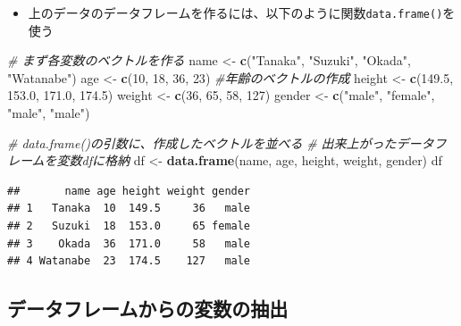 \documentclass[
]{book}
\newenvironment{Shaded}{\begin{snugshade}}{\end{snugshade}}
\newcommand{\CommentTok}[1]{\textcolor[rgb]{0.56,0.35,0.01}{\textit{#1}}}
\newcommand{\DecValTok}[1]{\textcolor[rgb]{0.00,0.00,0.81}{#1}}
\newcommand{\FloatTok}[1]{\textcolor[rgb]{0.00,0.00,0.81}{#1}}
\newcommand{\FunctionTok}[1]{\textcolor[rgb]{0.13,0.29,0.53}{\textbf{#1}}}
\newcommand{\NormalTok}[1]{#1}
\newcommand{\OtherTok}[1]{\textcolor[rgb]{0.56,0.35,0.01}{#1}}
\newcommand{\StringTok}[1]{\textcolor[rgb]{0.31,0.60,0.02}{#1}}
\providecommand{\tightlist}{%
  \setlength{\itemsep}{0pt}\setlength{\parskip}{0pt}}
\begin{document}
\begin{itemize}
\tightlist
\item
  上のデータのデータフレームを作るには、以下のように関数\texttt{data.frame()}を使う
\end{itemize}

\begin{Shaded}
\begin{Highlighting}[]
\CommentTok{\# まず各変数のベクトルを作る}
\NormalTok{name }\OtherTok{\textless{}{-}} \FunctionTok{c}\NormalTok{(}\StringTok{"Tanaka"}\NormalTok{, }\StringTok{"Suzuki"}\NormalTok{, }\StringTok{"Okada"}\NormalTok{, }\StringTok{"Watanabe"}\NormalTok{)}
\NormalTok{age }\OtherTok{\textless{}{-}} \FunctionTok{c}\NormalTok{(}\DecValTok{10}\NormalTok{, }\DecValTok{18}\NormalTok{, }\DecValTok{36}\NormalTok{, }\DecValTok{23}\NormalTok{) }\CommentTok{\#年齢のベクトルの作成}
\NormalTok{height }\OtherTok{\textless{}{-}} \FunctionTok{c}\NormalTok{(}\FloatTok{149.5}\NormalTok{, }\FloatTok{153.0}\NormalTok{, }\FloatTok{171.0}\NormalTok{, }\FloatTok{174.5}\NormalTok{)}
\NormalTok{weight }\OtherTok{\textless{}{-}} \FunctionTok{c}\NormalTok{(}\DecValTok{36}\NormalTok{, }\DecValTok{65}\NormalTok{, }\DecValTok{58}\NormalTok{, }\DecValTok{127}\NormalTok{)}
\NormalTok{gender }\OtherTok{\textless{}{-}} \FunctionTok{c}\NormalTok{(}\StringTok{"male"}\NormalTok{, }\StringTok{"female"}\NormalTok{, }\StringTok{"male"}\NormalTok{, }\StringTok{"male"}\NormalTok{) }

\CommentTok{\# data.frame()の引数に、作成したベクトルを並べる}
\CommentTok{\# 出来上がったデータフレームを変数dfに格納}
\NormalTok{df }\OtherTok{\textless{}{-}} \FunctionTok{data.frame}\NormalTok{(name, age, height, weight, gender)}
\NormalTok{df}
\end{Highlighting}
\end{Shaded}

\begin{verbatim}
##       name age height weight gender
## 1   Tanaka  10  149.5     36   male
## 2   Suzuki  18  153.0     65 female
## 3    Okada  36  171.0     58   male
## 4 Watanabe  23  174.5    127   male
\end{verbatim}

\hypertarget{ux30c7ux30fcux30bfux30d5ux30ecux30fcux30e0ux304bux3089ux306eux5909ux6570ux306eux62bdux51fa}{%
\subsection{データフレームからの変数の抽出}\label{ux30c7ux30fcux30bfux30d5ux30ecux30fcux30e0ux304bux3089ux306eux5909ux6570ux306eux62bdux51fa}}
\end{document}
